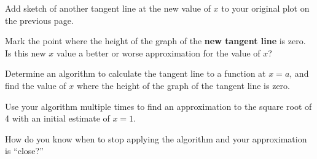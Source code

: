 \begin{problem}
\begin{subproblem}
    \vfill


  \item Add sketch of another tangent line at the new value of $x$ to
    your original plot on the previous page.

  \item Mark the point where the height of the graph of the
    \textbf{new tangent line} is zero. Is this new $x$ value a better
    or worse approximation for the value of $x$?


  \end{subproblem}

  \clearpage

\item Determine an algorithm to calculate the tangent line to a
  function at $x=a$, and find the value of $x$ where the height of the
  graph of the tangent line is zero.

  \vfill

\clearpage

\item Use your algorithm multiple times to find an approximation to
  the square root of 4 with an initial estimate of $x=1$.

  \vfill

\item How do you know when to stop applying the algorithm and your
  approximation is ``close?''

\end{problem}


\postClass

